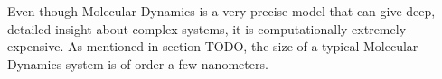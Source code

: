 Even though Molecular Dynamics is a very precise model that can give deep, detailed insight about complex systems, it is computationally extremely expensive. As mentioned in section TODO, the size of a typical Molecular Dynamics system is of order a few nanometers. 